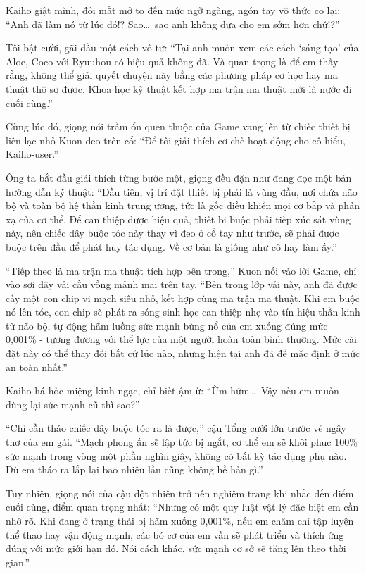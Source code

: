﻿\documentclass[../main.tex]{subfiles}
\begin{document}
Kaiho giật mình, đôi mắt mở to đến mức ngỡ ngàng, ngón tay vô thức co lại: ``Anh đã làm nó từ lúc đó!? Sao\dots\ sao anh không đưa cho em sớm hơn chứ!?''

Tôi bật cười, gãi đầu một cách vô tư: ``Tại anh muốn xem các cách `sáng tạo' của Aloe, Coco với Ryuuhou có hiệu quả không đã. Và quan trọng là để em thấy rằng, không thể giải quyết chuyện này bằng các phương pháp cơ học hay ma thuật thô sơ được. Khoa học kỹ thuật kết hợp ma trận ma thuật mới là nước đi cuối cùng.''

Cùng lúc đó, giọng nói trầm ổn quen thuộc của Game vang lên từ chiếc thiết bị liên lạc nhỏ Kuon đeo trên cổ: ``Để tôi giải thích cơ chế hoạt động cho cô hiểu, Kaiho-user.''

Ông ta bắt đầu giải thích từng bước một, giọng đều đặn như đang đọc một bản hướng dẫn kỹ thuật: ``Đầu tiên, vị trí đặt thiết bị phải là vùng đầu, nơi chứa não bộ và toàn bộ hệ thần kinh trung ương, tức là gốc điều khiển mọi cơ bắp và phản xạ của cơ thể. Để can thiệp được hiệu quả, thiết bị buộc phải tiếp xúc sát vùng này, nên chiếc dây buộc tóc này thay vì đeo ở cổ tay như trước, sẽ phải được buộc trên đầu để phát huy tác dụng. Về cơ bản là giống như cô hay làm ấy.''

``Tiếp theo là ma trận ma thuật tích hợp bên trong,'' Kuon nối vào lời Game, chỉ vào sợi dây vải cầu vồng mảnh mai trên tay. ``Bên trong lớp vải này, anh đã được cấy một con chip vi mạch siêu nhỏ, kết hợp cùng ma trận ma thuật. Khi em buộc nó lên tóc, con chip sẽ phát ra sóng sinh học can thiệp nhẹ vào tín hiệu thần kinh từ não bộ, tự động hãm luồng sức mạnh bùng nổ của em xuống đúng mức 0,001\% - tương đương với thể lực của một người hoàn toàn bình thường. Mức cài đặt này có thể thay đổi bất cứ lúc nào, nhưng hiện tại anh đã để mặc định ở mức an toàn nhất.''

Kaiho há hốc miệng kinh ngạc, chỉ biết ậm ừ: ``Ừm hứm\dots\ Vậy nếu em muốn dùng lại sức mạnh cũ thì sao?''

``Chỉ cần tháo chiếc dây buộc tóc ra là được,'' cậu Tổng cười lớn trước vẻ ngây thơ của em gái. ``Mạch phong ấn sẽ lập tức bị ngắt, cơ thể em sẽ khôi phục 100\% sức mạnh trong vòng một phần nghìn giây, không có bất kỳ tác dụng phụ nào. Dù em tháo ra lắp lại bao nhiêu lần cũng không hề hấn gì.''

Tuy nhiên, giọng nói của cậu đột nhiên trở nên nghiêm trang khi nhắc đến điểm cuối cùng, điểm quan trọng nhất: ``Nhưng có một quy luật vật lý đặc biệt em cần nhớ rõ. Khi đang ở trạng thái bị hãm xuống 0,001\%, nếu em chăm chỉ tập luyện thể thao hay vận động mạnh, các bó cơ của em vẫn sẽ phát triển và thích ứng đúng với mức giới hạn đó. Nói cách khác, sức mạnh cơ sở sẽ tăng lên theo thời gian.''
\end{document}
